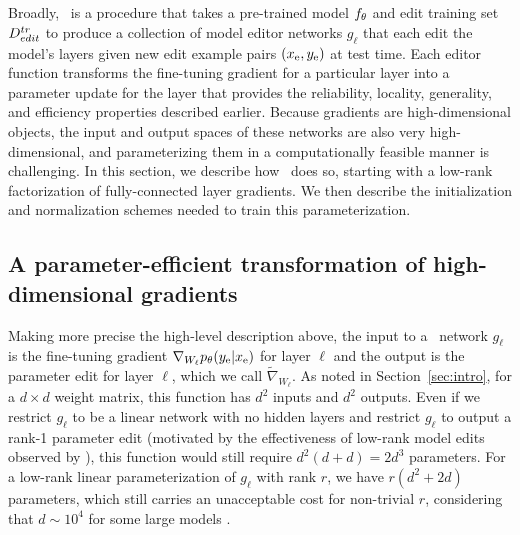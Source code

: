 \documentclass{article}
\begin{document}
\section{\fullname}
Broadly, \name~is a procedure that takes a pre-trained model $f_\theta$ and edit training set $D^{tr}_{edit}$ to produce a collection of model editor networks $g_\ell$ that each edit the model's layers given new edit example pairs $(x_\text{e}, y_\text{e})$ at test time. Each editor function transforms the fine-tuning gradient for a particular layer into a parameter update for the layer that provides the reliability, locality, generality, and efficiency properties described earlier. Because gradients are high-dimensional objects, the input and output spaces of these networks are also very high-dimensional, and parameterizing them in a computationally feasible manner is challenging. In this section, we describe how \name~does so, starting with a low-rank factorization of fully-connected layer gradients. We then describe the initialization and normalization schemes needed to train this parameterization.

\subsection{A parameter-efficient transformation of high-dimensional gradients}



Making more precise the high-level description above, the input to a \name~network $g_\ell$ is the fine-tuning gradient $\nabla_{W_\ell} p_\theta(y_\text{e}|x_\text{e})$ for layer $\ell$ and the output is the parameter edit for layer $\ell$, which we call $\tilde\nabla_{W_\ell}$. As noted in Section~\ref{sec:intro}, for a $d \times d$ weight matrix, this function has $d^2$ inputs and $d^2$ outputs. Even if we restrict $g_\ell$ to be a linear network with no hidden layers and restrict $g_\ell$ to output a rank-1 parameter edit (motivated by the effectiveness of low-rank model edits observed by \cite{hu2021lora}), this function would still require $d^2(d+d) = 2d^3$ parameters. For a low-rank linear parameterization of $g_\ell$ with rank $r$, we have $r(d^2 + 2d)$ parameters, which still carries an unacceptable cost for non-trivial $r$, considering that $d\sim 10^4$ for some large models \citep{radford2019language,2020t5}.
\end{document}
